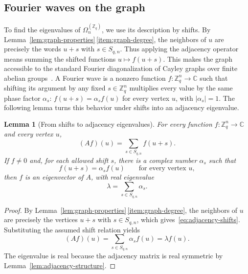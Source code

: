\documentclass[11pt,a4paper]{article}
\numberwithin{equation}{section}
\numberwithin{figure}{section}
\numberwithin{table}{section}
\numberwithin{footnote}{section}
\newtheorem{lemma}[theorem]{Lemma}
\theoremstyle{informal}\newtheorem*{informaltheorem}{Informal theorem}
\theoremstyle{definition}\newtheorem{example}{Example}[section]
\theoremstyle{remark}\newtheorem{remark}[theorem]{Remark}
\newcommand{\Z}{\mathbb Z}
\newcommand{\C}{\mathbb C}
\newcommand{\Om}{\Omega_n^{(\Z_q)}}
\begin{document}
\subsection{Fourier waves on the graph}\label{sec:fourier-waves}
To find the eigenvalues of \(\Om\), we use its description by
shifts. By
Lemma~\ref{lem:graph-properties}\,\ref{item:graph-degree}, the neighbors
of \(u\) are precisely the words \(u+s\) with \(s\in S_{q,n}\).
Thus applying the adjacency operator means summing the shifted
functions \(u\mapsto f(u+s)\). This makes the graph accessible
to the standard Fourier diagonalization of Cayley graphs over finite
abelian groups~\cite[Sec.~1.4.9]{bh}.
A Fourier wave is a nonzero function \(f:\Z_q^n\to\C\) such that
shifting its argument by any fixed \(s\in\Z_q^n\) multiplies every
value by the same phase factor \(\alpha_s\):
\(f(u+s)=\alpha_s f(u)\) for every vertex \(u\), with
\(|\alpha_s|=1\).
The following lemma turns this behavior under shifts into an
adjacency eigenvalue.

\begin{lemma}[From shifts to adjacency eigenvalues]
\label{lem:shifts-to-eigenvalues}
For every function \(f:\Z_q^n\to\C\) and every vertex \(u\),
\begin{equation}\label{eq:adjacency-shifts}
 (Af)(u)=\sum_{s\in S_{q,n}}f(u+s).
\end{equation}
If \(f\ne0\) and, for each allowed shift \(s\), there is a
complex number \(\alpha_s\) such that
\begin{equation}
 f(u+s)=\alpha_s f(u)\qquad\text{for every vertex }u,
\end{equation}
then \(f\) is an eigenvector of \(A\), with real eigenvalue
\begin{equation}\label{eq:shift-eigenvalue}
 \lambda=\sum_{s\in S_{q,n}}\alpha_s.
\end{equation}
\end{lemma}
\begin{proof}
By Lemma~\ref{lem:graph-properties}\,\ref{item:graph-degree}, the
neighbors of \(u\) are precisely the vertices \(u+s\) with
\(s\in S_{q,n}\), which gives~\eqref{eq:adjacency-shifts}.
Substituting the assumed shift relation yields
\begin{equation}
 (Af)(u)=\sum_{s\in S_{q,n}}\alpha_s f(u)=\lambda f(u).
\end{equation}
The eigenvalue is real because the adjacency matrix is real
symmetric by Lemma~\ref{lem:adjacency-structure}.
\end{proof}
\end{document}
